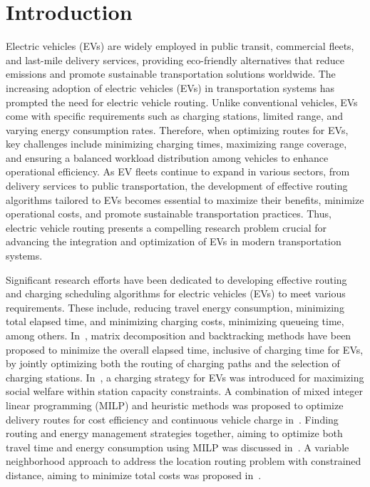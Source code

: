 \documentclass[conference]{IEEEtran}
\begin{document}
\section{Introduction} \label{sec:intro}
Electric vehicles (EVs) are widely employed in public transit, commercial fleets, and last-mile delivery services, providing eco-friendly alternatives that reduce emissions and promote sustainable transportation solutions worldwide.
The increasing adoption of electric vehicles (EVs) in transportation systems has prompted the need for electric vehicle routing. Unlike conventional vehicles, EVs come with specific requirements such as charging stations, limited range, and varying energy consumption rates.  Therefore, when optimizing routes for EVs, key challenges include minimizing charging times, maximizing range coverage, and ensuring a balanced workload distribution among vehicles to enhance operational efficiency. As EV fleets continue to expand in various sectors, from delivery services to public transportation, the development of effective routing algorithms tailored to EVs becomes essential to maximize their benefits, minimize operational costs, and promote sustainable transportation practices. Thus, electric vehicle routing presents a compelling research problem crucial for advancing the integration and optimization of EVs in modern transportation systems.

Significant research efforts have been dedicated to developing effective routing and charging scheduling algorithms for electric vehicles (EVs) to meet various requirements. These include, reducing travel energy consumption, minimizing total elapsed time, and minimizing charging costs, minimizing queueing time, among others.
In~\cite{qian2020electric}, matrix decomposition and backtracking methods have been proposed to minimize the overall elapsed time, inclusive of charging time for EVs, by jointly optimizing both the routing of charging paths and the selection of charging stations.
In~\cite{alinia2019online}, a charging strategy for EVs was introduced for maximizing social welfare within station capacity constraints. A combination of mixed integer linear programming (MILP) and heuristic methods was proposed to optimize delivery routes for cost efficiency and continuous vehicle charge in~\cite{pelletier2019electric}. Finding routing and energy management strategies together, aiming to optimize both travel time and energy consumption using MILP was discussed in~\cite{salazar2019optimal}. A variable neighborhood approach to address the location routing problem with constrained distance, aiming to minimize total costs was proposed in~\cite{almouhanna2020location}. 
\end{document}
